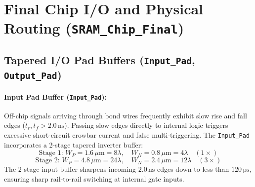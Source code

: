 \documentclass[10pt,a4paper,titlepage]{article}
\begin{document}
\section{Final Chip I/O and Physical Routing (\texttt{SRAM\_Chip\_Final})}

\subsection{Tapered I/O Pad Buffers (\texttt{Input\_Pad}, \texttt{Output\_Pad})}
\paragraph{Input Pad Buffer (\texttt{Input\_Pad}):} Off-chip signals arriving through bond wires frequently exhibit slow rise and fall edges ($t_r, t_f > 2.0\,\text{ns}$). Passing slow edges directly to internal logic triggers excessive short-circuit crowbar current and false multi-triggering. The \texttt{Input\_Pad} incorporates a 2-stage tapered inverter buffer:
\begin{equation}
    \text{Stage 1: } W_P = 1.6\,\mu\text{m} = 8\lambda, \quad W_N = 0.8\,\mu\text{m} = 4\lambda \quad (1\times)
\end{equation}
\begin{equation}
    \text{Stage 2: } W_P = 4.8\,\mu\text{m} = 24\lambda, \quad W_N = 2.4\,\mu\text{m} = 12\lambda \quad (3\times)
\end{equation}
The 2-stage input buffer sharpens incoming $2.0\,\text{ns}$ edges down to less than \textbf{$120\,\text{ps}$}, ensuring sharp rail-to-rail switching at internal gate inputs.
\end{document}
